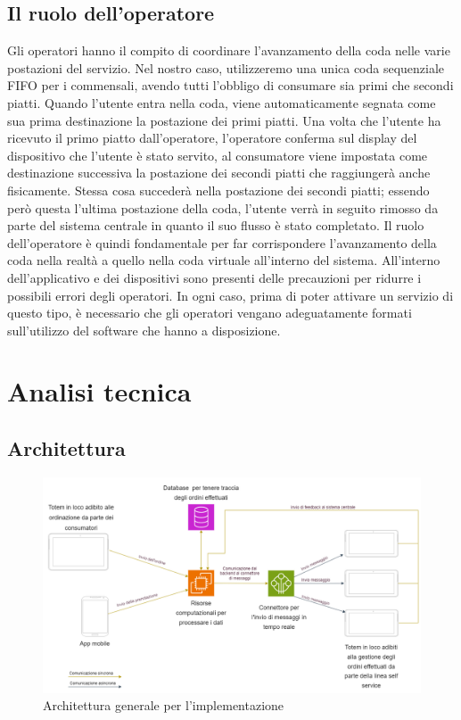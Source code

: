 \documentclass[a4paper, titlepage, 12pt, openright, twoside]{book}
\begin{document}
\subsection{Il ruolo dell'operatore}
Gli operatori hanno il compito di coordinare l'avanzamento della coda nelle varie postazioni del servizio.
Nel nostro caso, utilizzeremo una unica coda sequenziale FIFO per i commensali, avendo tutti l'obbligo di consumare sia primi che secondi piatti.
Quando l'utente entra nella coda, viene automaticamente segnata come sua prima destinazione la postazione dei primi piatti.
Una volta che l'utente ha ricevuto il primo piatto dall'operatore, l'operatore conferma sul display del dispositivo che l'utente è stato servito, al consumatore viene impostata come destinazione successiva la postazione dei secondi piatti che raggiungerà anche fisicamente.
Stessa cosa succederà nella postazione dei secondi piatti; essendo però questa l'ultima postazione della coda, l'utente verrà in seguito rimosso da parte del sistema centrale in quanto il suo flusso è stato completato. Il ruolo dell'operatore è quindi fondamentale per far corrispondere l'avanzamento della coda nella realtà a quello nella coda virtuale all'interno del sistema. All'interno dell'applicativo e dei dispositivi sono presenti delle precauzioni per ridurre i possibili errori degli operatori. In ogni caso, prima di poter attivare un servizio di questo tipo, è necessario che gli operatori vengano adeguatamente formati sull'utilizzo del software che hanno a disposizione.

\section{Analisi tecnica}

\subsection{Architettura}

\begin{figure}[h]
\caption{Architettura generale per l'implementazione}
\includegraphics[scale=0.32]{architettura}
\centering
\end{figure}
\end{document}
